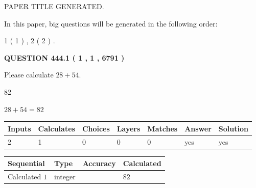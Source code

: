\documentclass[12pt]{article}
\begin{document}
 
 
 
   
   
 PAPER TITLE GENERATED.
   
   
   
\vspace{0.2in}
   
In this paper, big questions will be generated in the following order: 
   
   
   1 ( 1 )
 ,
   2 ( 2 )
 .
  
\vspace{0.2in}
  
{\textbf{\Large{QUESTION
444.1 
 ( 1 , 1 , 6791 )
}}}
  
  
 
Please calculate $ %
28 +  %
54 $.
 
 
 
\noindent{}
 
 

82
 
 
\noindent{}
 
 

 
 
 
\noindent{}
 
 

$ %
28 +  %
54=   %
82$
 
 
\noindent{}
 
 

 
   
   
   
   
\noindent\begin{tabular}{|l|l|l|l|l|l|l|}
 \hline
Inputs & Calculates & Choices & Layers & Matches & Answer & Solution \\ \hline
 2  & 
 1  & 
 0
  & 
 0  & 
 0  & 
  yes & 
  yes 
  \\ \hline
 \end{tabular}
   
   
   
   
\noindent{}
   
   
  
  
\noindent\begin{tabular}{|l|l|l|l|}
\hline
 Sequential & Type & Accuracy & Calculated \\ 
\hline
 
 
  Calculated $  1 $ & integer &  & 
  $ 82 $ 
 \\  \hline  
 \end{tabular}
   
\end{document}
